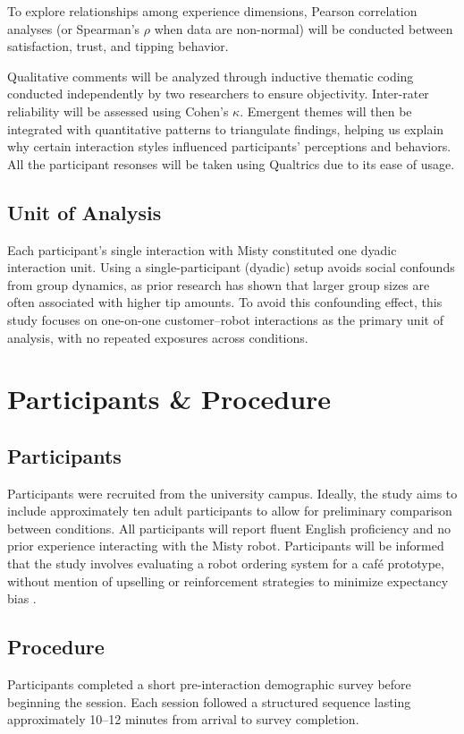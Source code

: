 \documentclass[conference]{IEEEtran}
\begin{document}
To explore relationships among experience dimensions, Pearson correlation analyses (or Spearman's $\rho$ when data are non-normal) will be conducted between satisfaction, trust, and tipping behavior.

Qualitative comments will be analyzed through inductive thematic coding conducted independently by two researchers to ensure objectivity. Inter-rater reliability will be assessed using Cohen's $\kappa$. Emergent themes will then be integrated with quantitative patterns to triangulate findings, helping us explain why certain interaction styles influenced participants' perceptions and behaviors. All the participant resonses will be taken using Qualtrics due to its ease of usage.

\subsection{Unit of Analysis}
Each participant's single interaction with Misty constituted one dyadic interaction unit. Using a single-participant (dyadic) setup avoids social confounds from group dynamics, as prior research has shown that larger group sizes are often associated with higher tip amounts\cite{b33}. To avoid this confounding effect, this study focuses on one-on-one customer–robot interactions as the primary unit of analysis, with no repeated exposures across conditions.

\section{Participants \& Procedure}
\label{sec:participants_procedure}
\subsection{Participants}
Participants were recruited from the university campus. Ideally, the study aims to include approximately ten adult participants to allow for preliminary comparison between conditions. All participants will report fluent English proficiency and no prior experience interacting with the Misty robot. Participants will be informed that the study involves evaluating a robot ordering system for a café prototype, without mention of upselling or reinforcement strategies to minimize expectancy bias \cite{b32}.


\subsection{Procedure}
Participants completed a short pre-interaction demographic survey before beginning the session. Each session followed a structured sequence lasting approximately 10--12 minutes from arrival to survey completion.
\end{document}
